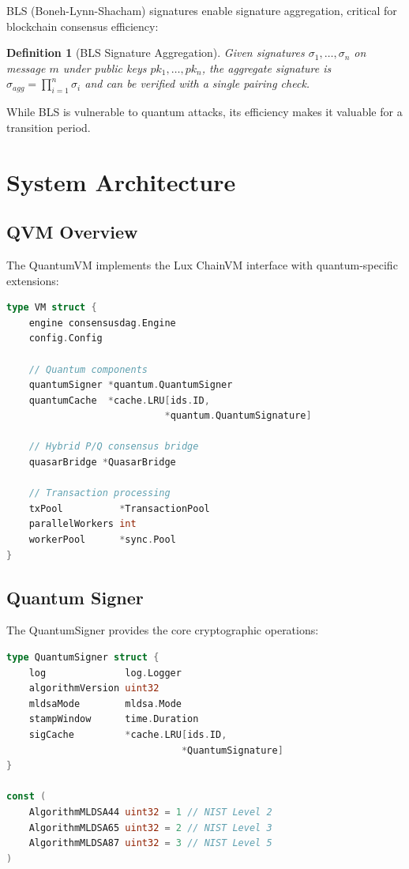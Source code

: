 \documentclass[11pt,a4paper]{article}
\newtheorem{definition}{Definition}
\begin{document}
BLS (Boneh-Lynn-Shacham) signatures enable signature aggregation, critical for blockchain consensus efficiency:

\begin{definition}[BLS Signature Aggregation]
Given signatures $\sigma_1, \ldots, \sigma_n$ on message $m$ under public keys $pk_1, \ldots, pk_n$, the aggregate signature is $\sigma_{agg} = \prod_{i=1}^{n} \sigma_i$ and can be verified with a single pairing check.
\end{definition}

While BLS is vulnerable to quantum attacks, its efficiency makes it valuable for a transition period.

\section{System Architecture}

\subsection{QVM Overview}

The QuantumVM implements the Lux ChainVM interface with quantum-specific extensions:

\begin{lstlisting}[language=Go,caption={QVM Core Structure}]
type VM struct {
    engine consensusdag.Engine
    config.Config

    // Quantum components
    quantumSigner *quantum.QuantumSigner
    quantumCache  *cache.LRU[ids.ID,
                            *quantum.QuantumSignature]

    // Hybrid P/Q consensus bridge
    quasarBridge *QuasarBridge

    // Transaction processing
    txPool          *TransactionPool
    parallelWorkers int
    workerPool      *sync.Pool
}
\end{lstlisting}

\subsection{Quantum Signer}

The QuantumSigner provides the core cryptographic operations:

\begin{lstlisting}[language=Go,caption={ML-DSA Signer}]
type QuantumSigner struct {
    log              log.Logger
    algorithmVersion uint32
    mldsaMode        mldsa.Mode
    stampWindow      time.Duration
    sigCache         *cache.LRU[ids.ID,
                               *QuantumSignature]
}

const (
    AlgorithmMLDSA44 uint32 = 1 // NIST Level 2
    AlgorithmMLDSA65 uint32 = 2 // NIST Level 3
    AlgorithmMLDSA87 uint32 = 3 // NIST Level 5
)
\end{lstlisting}
\end{document}
